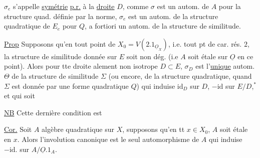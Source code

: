 
 $\sigma_e$ s'appelle \uline{symétrie} \uline{p.r.} à la \uline{droite} $D$, comme $\sigma$ est un autom. de $A$ pour la structure quad. définie par la norme, $\sigma_e$ est un autom. de la structure quadratique de $E_e$ pour $Q$, a fortiori un autom. de la structure de similitude.

\uline{Prop} Supposons qu'en tout point de $X_0=V(2.1_{\underline O_X})$, i.e. tout pt de car. rés. $2$, la structure de similitude donnée sur $E$ soit non dég. (i.e $A$ soit étale sur $\underline O$ en ce point). Alors pour tte droite alement non isotrope $D\subset E$, $\sigma_D$ est l'\uline{unique} autom. $\Theta$ de la structure de similitude $\Sigma$ (ou encore, de la structure quadratique, quand $\Sigma$ est donnée par une forme quadratique $Q$)  qui induise $\mathrm{id}_D$ sur $D$, $-\mathrm{id}$ sur $E/D$,$^*$ et qui  soit    


\uline{NB} Cette dernière condition   est 

\uline{Cor.} Soit $A$ algèbre quadratique sur $X$, supposons qu'en tt $x\in X_0$, $A$ soit étale en $x$. Alors l'involution canonique est le seul automorphisme  de $A$ qui induise $-\mathrm{id}.$ sur $A/\underline O.1_A$.

